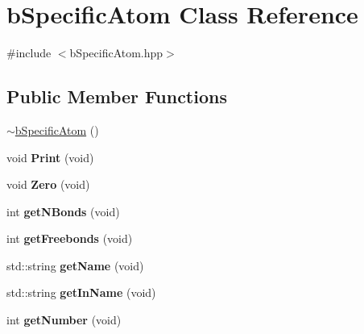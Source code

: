 \hypertarget{classbSpecificAtom}{}\section{b\+Specific\+Atom Class Reference}
\label{classbSpecificAtom}


{\ttfamily \#include $<$b\+Specific\+Atom.\+hpp$>$}

\subsection*{Public Member Functions}
\begin{DoxyCompactItemize}
\item 
\hyperlink{classbSpecificAtom_abd7869c0fbfda9fa7c99f4e7151b4f18}{$\sim$b\+Specific\+Atom} ()
\item 
void {\bfseries Print} (void)\hypertarget{classbSpecificAtom_ac7de1ffde8b5053975d3ab3893efabaa}{}\label{classbSpecificAtom_ac7de1ffde8b5053975d3ab3893efabaa}

\item 
void {\bfseries Zero} (void)\hypertarget{classbSpecificAtom_af94255f508c081c70904eae05d6859c4}{}\label{classbSpecificAtom_af94255f508c081c70904eae05d6859c4}

\item 
int {\bfseries get\+N\+Bonds} (void)\hypertarget{classbSpecificAtom_a1fad6d77ec456be244f6954d50f7dc3b}{}\label{classbSpecificAtom_a1fad6d77ec456be244f6954d50f7dc3b}

\item 
int {\bfseries get\+Freebonds} (void)\hypertarget{classbSpecificAtom_a143e212812ccc6a8b77b4def85d29c84}{}\label{classbSpecificAtom_a143e212812ccc6a8b77b4def85d29c84}

\item 
std\+::string {\bfseries get\+Name} (void)\hypertarget{classbSpecificAtom_abcf07b99dff11601bdc33e156dbbbc59}{}\label{classbSpecificAtom_abcf07b99dff11601bdc33e156dbbbc59}

\item 
std\+::string {\bfseries get\+In\+Name} (void)\hypertarget{classbSpecificAtom_ae28c48da6f1bc9c5f149889b25db3fcb}{}\label{classbSpecificAtom_ae28c48da6f1bc9c5f149889b25db3fcb}

\item 
int {\bfseries get\+Number} (void)\hypertarget{classbSpecificAtom_a6d6f46690d08d8c8ca082f0840e2584b}{}\label{classbSpecificAtom_a6d6f46690d08d8c8ca082f0840e2584b}


\end{DoxyCompactItemize}
